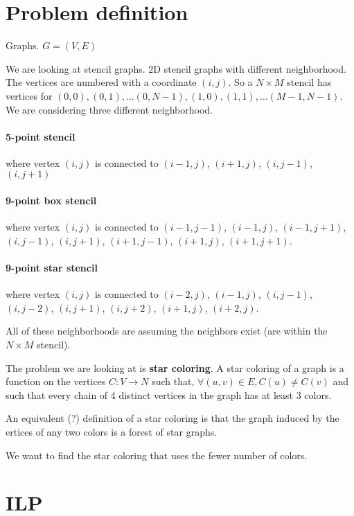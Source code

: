 \documentclass{article}
\begin{document}
\section{Problem definition}

Graphs. $G=(V,E)$

We are looking at stencil graphs. 2D stencil graphs with different
neighborhood.  The vertices are numbered with a coordinate $(i,j)$. So
a $N \times M$ stencil has vertices for $(0,0), (0,1), \dots (0, N-1),
(1,0), (1,1), \dots (M-1, N-1)$.  We are considering three different
neighborhood.

\paragraph{5-point stencil} where vertex $(i,j)$ is connected to $(i-1,j)$,
$(i+1,j)$, $(i,j-1)$, $(i,j+1)$

\paragraph{9-point box stencil} where vertex $(i,j)$ is connected to
$(i-1,j-1)$, $(i-1,j)$, $(i-1,j+1)$,
$(i,j-1)$, $(i,j+1)$,
$(i+1,j-1)$, $(i+1,j)$, $(i+1,j+1)$.

\paragraph{9-point star stencil} where vertex $(i,j)$ is connected to
$(i-2,j)$, $(i-1,j)$, $(i,j-1)$, $(i,j-2)$, $(i,j+1)$, $(i,j+2)$,
$(i+1,j)$, $(i+2,j)$.

All of these neighborhoods are assuming the neighbors exist (are
within the $N \times M$ stencil).


The problem we are looking at is \textbf{star coloring}. A star coloring of a
graph is a function on the vertices $C: V \rightarrow N$ such that,
$\forall (u,v) \in E, C(u) \neq C(v)$ and such that every chain of 4
distinct vertices in the graph has at least 3 colors.

An equivalent (?) definition of a star coloring is that the graph
induced by the ertices of any two colors is a forest of star graphs.

We want to find the star coloring that uses the fewer number of colors.

\section{ILP}
\end{document}
